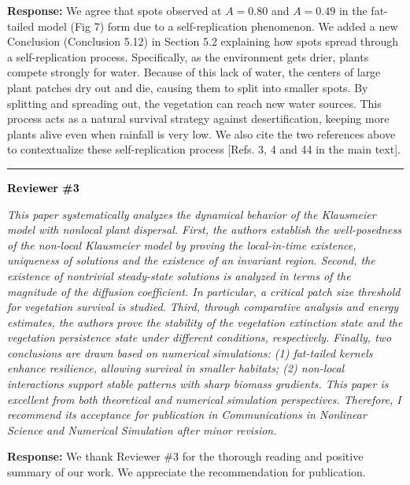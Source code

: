 \documentclass[11pt,a4paper]{article}
\newcommand{\reviewer}[1]{\vspace{1em}\noindent\textbf{\textcolor{black}{#1}}}
\newcommand{\comment}[1]{\vspace{0.5em}\noindent\textit{\textcolor{revcolor}{#1}}}
\newcommand{\response}[1]{\vspace{0.5em}\noindent\textbf{\textcolor{authorcolor}{Response:}} \textcolor{authorcolor}{#1}}
\begin{document}
\response{We agree that spots observed at $A = 0.80$ and $A = 0.49$ in the fat-tailed model (Fig 7) form due to a self-replication phenomenon. We added a new Conclusion (Conclusion 5.12) in Section 5.2 explaining how spots spread through a self-replication process. Specifically, as the environment gets drier, plants compete strongly for water. Because of this lack of water, the centers of large plant patches dry out and die, causing them to split into smaller spots. By splitting and spreading out, the vegetation can reach new water sources. This process acts as a natural survival strategy against desertification, keeping more plants alive even when rainfall is very low.
We also cite the two references above to contextualize these self-replication process [Refs. 3, 4 and 44 in the main text].}

\vspace{2em}
\hrule
\vspace{2em}

\reviewer{Reviewer \#3}

\comment{This paper systematically analyzes the dynamical behavior of the Klausmeier model with nonlocal plant dispersal. First, the authors establish the well-posedness of the non-local Klausmeier model by proving the local-in-time existence, uniqueness of solutions and the existence of an invariant region. Second, the existence of nontrivial steady-state solutions is analyzed in terms of the magnitude of the diffusion coefficient. In particular, a critical patch size threshold for vegetation survival is studied. Third, through comparative analysis and energy estimates, the authors prove the stability of the vegetation extinction state and the vegetation persistence state under different conditions, respectively. Finally, two conclusions are drawn based on numerical simulations: (1) fat-tailed kernels enhance resilience, allowing survival in smaller habitats; (2) non-local interactions support stable patterns with sharp biomass gradients. This paper is excellent from both theoretical and numerical simulation perspectives. Therefore, I recommend its acceptance for publication in Communications in Nonlinear Science and Numerical Simulation after minor revision.}

\response{We thank Reviewer \#3 for the thorough reading and positive summary of our work. We appreciate the recommendation for publication.}
\end{document}
